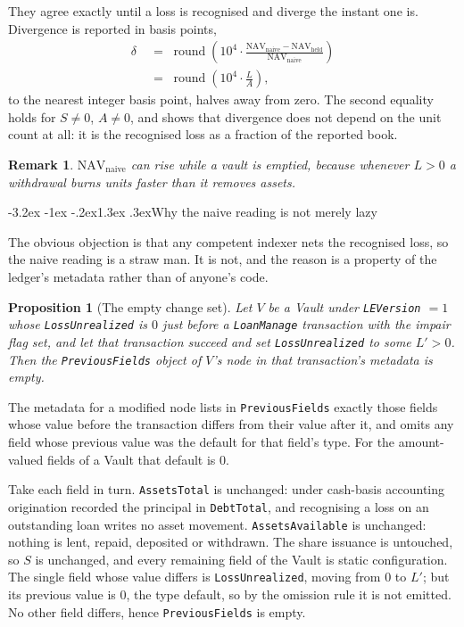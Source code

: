 \documentclass[11pt]{article}
\makeatletter
\renewcommand\subsection{\@startsection{subsection}{2}{\z@}%
  {-3.2ex \@plus -1ex \@minus -.2ex}{1.3ex \@plus .3ex}{\normalfont\large\bfseries}}
\theoremstyle{orma}
\newtheorem{proposition}[theorem]{Proposition}
\theoremstyle{ormaupright}
\newtheorem*{remark}{Remark}
\renewenvironment{proof}[1][\proofname]{%
  \par\addvspace{5pt}%
  \pushQED{\qed}%
  \normalfont
  \list{}{\leftmargin=1.8em \rightmargin=0pt \topsep=0pt
          \parsep=\parskip \itemsep=0pt \labelwidth=0pt \labelsep=0pt}%
  \item[]\relax
  {\itshape #1\@addpunct{.}}\hspace{0.75em}\ignorespaces
}{%
  \popQED\endlist\@endpefalse\addvspace{5pt}%
}
\DeclareMathOperator{\round}{round}
\makeatother
\begin{document}
They agree exactly until a loss is recognised and diverge the instant one is. Divergence is
reported in basis points,
\begin{align}
  \delta
  \;&=\; \round\!\left( 10^{4} \cdot
    \frac{\mathrm{NAV}_{\mathrm{naive}} - \mathrm{NAV}_{\mathrm{held}}}{\mathrm{NAV}_{\mathrm{naive}}} \right)
  \\[6pt]
  \;&=\; \round\!\left( 10^{4} \cdot \frac{L}{A} \right),
\end{align}
to the nearest integer basis point, halves away from zero. The second equality holds for
$S \neq 0$, $A \neq 0$, and shows that divergence does not depend on the unit count at all:
it is the recognised loss as a fraction of the reported book.

\begin{remark}
$\mathrm{NAV}_{\mathrm{naive}}$ can \emph{rise} while a vault is emptied, because whenever
$L > 0$ a withdrawal burns units faster than it removes assets.
\end{remark}

\subsection{Why the naive reading is not merely lazy}

The obvious objection is that any competent indexer nets the recognised loss, so the naive
reading is a straw man. It is not, and the reason is a property of the ledger's metadata
rather than of anyone's code.

\begin{proposition}[The empty change set]
\label{prop:empty}
Let $V$ be a Vault under \texttt{LEVersion} $=1$ whose \texttt{LossUnrealized} is $0$ just
before a \texttt{LoanManage} transaction with the impair flag set, and let that transaction
succeed and set \texttt{LossUnrealized} to some $L' > 0$. Then the \texttt{PreviousFields}
object of $V$'s node in that transaction's metadata is empty.
\end{proposition}

\begin{proof}
The metadata for a modified node lists in \texttt{PreviousFields} exactly those fields whose
value before the transaction differs from their value after it, and omits any field whose
previous value was the default for that field's type. For the amount-valued fields of a
Vault that default is $0$.

Take each field in turn. \texttt{AssetsTotal} is unchanged: under cash-basis accounting
origination recorded the principal in \texttt{DebtTotal}, and recognising a loss on an
outstanding loan writes no asset movement. \texttt{AssetsAvailable} is unchanged: nothing is
lent, repaid, deposited or withdrawn. The share issuance is untouched, so $S$ is unchanged,
and every remaining field of the Vault is static configuration. The single field whose value
differs is \texttt{LossUnrealized}, moving from $0$ to $L'$; but its previous value is $0$,
the type default, so by the omission rule it is not emitted. No other field differs, hence
\texttt{PreviousFields} is empty.
\end{proof}
\end{document}

